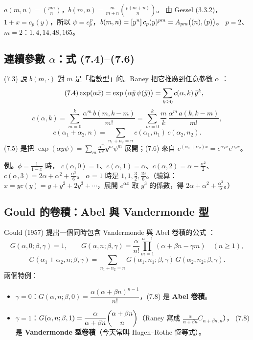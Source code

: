 \begin{exbox}[例 2：$\phi=(1+x)^p$，Fuss--Catalan]
$a(m,n)=\binom{pm}{n}$，$b(m,n)=\frac{m}{m+n}\binom{p(m+n)}{n}$。
由 Gessel (3.3.2)，$1+x=c_p(y)$，所以 $\psi=c_p^{\,p}$，$b(m,n)=[y^n]\,c_p(y)^{pm}=A_{pm}\big((n),(p)\big)$。
$p=2$、$m=2$：$1,4,14,48,165$。
\end{exbox}

\subsection{連續參數 $\alpha$：式 (7.4)--(7.6)}

(7.3) 說 $b(m,\cdot)$ 對 $m$ 是「指數型」的。Raney 把它推廣到任意參數 $\alpha$ ：
\begin{equation}\tag{7.4}
\exp(\alpha\bar x)=\exp\big(\alpha\bar y\,\psi(\bar y)\big)=\sum_{k\ge0}c(\alpha,k)\,\bar y^k,
\end{equation}
\begin{equation}\tag{7.5}
c(\alpha,k)=\sum_{m=0}^{k}\frac{\alpha^m\,b(m,k-m)}{m!}=\sum_{m=0}^{k}\frac mk\,\frac{\alpha^m\,a(k,k-m)}{m!},
\end{equation}
\begin{equation}\tag{7.6}
c(\alpha_1+\alpha_2,n)=\sum_{n_1+n_2=n}c(\alpha_1,n_1)\,c(\alpha_2,n_2).
\end{equation}
(7.5) 是把 $\exp(\alpha y\psi)=\sum_m\frac{\alpha^m}{m!}y^m\psi^m$ 展開；(7.6) 來自 $e^{(\alpha_1+\alpha_2)x}=e^{\alpha_1x}e^{\alpha_2x}$。

\textbf{例。}$\phi=\frac1{1-x}$ 時，
$c(\alpha,0)=1$、$c(\alpha,1)=\alpha$、$c(\alpha,2)=\alpha+\frac{\alpha^2}2$、$c(\alpha,3)=2\alpha+\alpha^2+\frac{\alpha^3}6$。
$\alpha=1$ 時是 $1,1,\frac32,\frac{19}6$。（驗算：$x=yc(y)=y+y^2+2y^3+\cdots$，展開 $e^{\alpha x}$ 取 $y^3$ 的係數，得 $2\alpha+\alpha^2+\frac{\alpha^3}{6}$。）

\subsection{Gould 的卷積：Abel 與 Vandermonde 型}

Gould (1957) 提出一個同時包含 Vandermonde 與 Abel 卷積的公式 ：
\begin{equation}\tag{7.7}
G(\alpha,0;\beta,\gamma)=1,\qquad G(\alpha,n;\beta,\gamma)=\frac{\alpha}{n!}\prod_{m=1}^{n-1}(\alpha+\beta n-\gamma m)\quad(n\ge1),
\end{equation}
\begin{equation}\tag{7.8}
G(\alpha_1+\alpha_2,n;\beta,\gamma)=\sum_{n_1+n_2=n}G(\alpha_1,n_1;\beta,\gamma)\,G(\alpha_2,n_2;\beta,\gamma).
\end{equation}
兩個特例：
\begin{itemize}
  \item $\gamma=0$：$G(\alpha,n;\beta,0)=\dfrac{\alpha(\alpha+\beta n)^{n-1}}{n!}$，(7.8) 是 \textbf{Abel 卷積}。
  \item $\gamma=1$：$G(\alpha,n;\beta,1)=\dfrac{\alpha}{\alpha+\beta n}\dbinom{\alpha+\beta n}{n}$（Raney 寫成 $\frac{\alpha}{\alpha+\beta n}C_{\alpha+\beta n,n}$），
        (7.8) 是 \textbf{Vandermonde 型卷積}（今天常叫 Hagen--Rothe 恆等式）。
\end{itemize}

